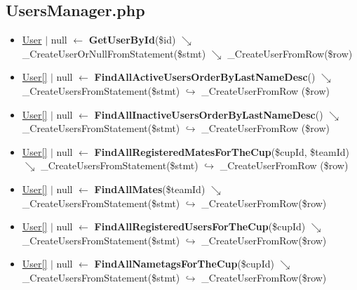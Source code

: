 \subsection{UsersManager.php}
\begin{itemize}
  \setlength\itemsep{0em}
  \item \underline{User} $\vert$ null $\leftarrow$ \textbf{GetUserById}(\$id)
  \newline    $\searrow$ \_CreateUserOrNullFromStatement(\$stmt)
  \newline    $\searrow$ \_CreateUserFromRow(\$row)
  \item \underline{User[]} $\vert$ null $\leftarrow$ \textbf{FindAllActiveUsersOrderByLastNameDesc}()
  \newline    $\searrow$ \_CreateUsersFromStatement(\$stmt)
  \newline    $\hookrightarrow$ \_CreateUserFromRow (\$row)
  \item \underline{User[]} $\vert$ null $\leftarrow$ \textbf{FindAllInactiveUsersOrderByLastNameDesc}()
  \newline    $\searrow$ \_CreateUsersFromStatement(\$stmt)
  \newline    $\hookrightarrow$ \_CreateUserFromRow (\$row)
  \item \underline{User[]} $\vert$ null $\leftarrow$ \textbf{FindAllRegisteredMatesForTheCup}(\$cupId, \$teamId)
  \newline    $\searrow$ \_CreateUsersFromStatement(\$stmt)
  \newline    $\hookrightarrow$ \_CreateUserFromRow (\$row)
  \item \underline{User[]} $\vert$ null $\leftarrow$ \textbf{FindAllMates}(\$teamId)
  \newline    $\searrow$ \_CreateUsersFromStatement(\$stmt)
  \newline    $\hookrightarrow$ \_CreateUserFromRow(\$row)
  \item \underline{User[]} $\vert$ null $\leftarrow$ \textbf{FindAllRegisteredUsersForTheCup}(\$cupId)
  \newline    $\searrow$ \_CreateUsersFromStatement(\$stmt)
  \newline    $\hookrightarrow$ \_CreateUserFromRow(\$row)
  \item \underline{User[]} $\vert$ null $\leftarrow$ \textbf{FindAllNametagsForTheCup}(\$cupId)
  \newline    $\searrow$ \_CreateUsersFromStatement(\$stmt)
  \newline    $\hookrightarrow$ \_CreateUserFromRow(\$row)

\end{itemize}
